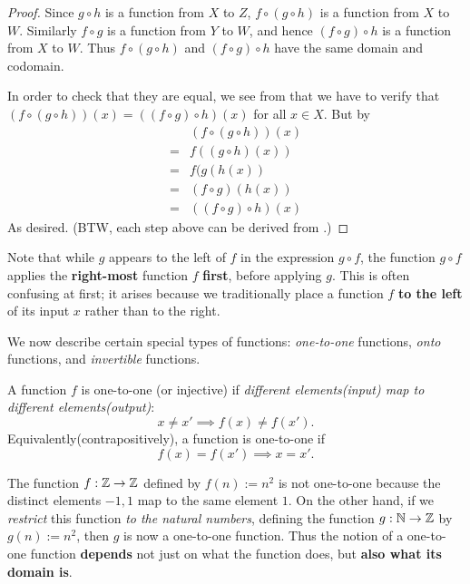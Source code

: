 \begin{proof}
Since \(g \circ h\) is a function from \(X\) to \(Z\), \(f \circ (g \circ h)\) is a function from \(X\) to \(W\).
Similarly \(f \circ g\) is a function from \(Y\) to \(W\), and hence \((f \circ g) \circ h\) is a function from \(X\) to \(W\).
Thus \(f \circ (g \circ h)\) and \((f \circ g) \circ h\) have the same domain and codomain.

In order to check that they are equal, we see from  that we have to verify that \((f \circ (g \circ h))(x) = ((f \circ g) \circ h)(x)\) for all \(x \in X\).
But by 
\begin{align*}
      & (f \circ (g \circ h))(x) \\
    = & f((g \circ h)(x)) \\
    = & f(g(h(x)) \\
    = & (f \circ g)(h(x)) \\
    = & ((f \circ g) \circ h)(x)
\end{align*}
As desired. (BTW, each step above can be derived from .)
\end{proof}

\begin{remark} \label{remark 3.3.13}
Note that while \(g\) appears to the left of \(f\) in the expression \(g \circ f\), the function \(g \circ f\) applies the \textbf{right-most} function \(f\)
\textbf{first}, before applying \(g\).
This is often confusing at first; it arises because we traditionally place a function \(f\) \textbf{to the left} of its input \(x\) rather than to the right.
\end{remark}

We now describe certain special types of functions: \emph{one-to-one} functions, \emph{onto} functions, and \emph{invertible} functions.

\begin{definition}  \label{def 3.3.14}
A function \(f\) is one-to-one (or injective) if \emph{different elements(input) map to different elements(output)}:
\[
x \neq x' \implies f(x) \neq f(x').
\]
Equivalently(contrapositively), a function is one-to-one if
\[
    f(x) = f(x') \implies x = x'.
\]
\end{definition}

\begin{example} [Informal] \label{example 3.3.15}
The function \(f : \mathbb{Z} \rightarrow \mathbb{Z}\) defined by \(f(n) := n^2\) is not one-to-one because the distinct elements \(-1, 1\) map to the same element \(1\). 
On the other hand, if we \emph{restrict} this function \emph{to the natural numbers}, defining the function \(g : \mathbb{N} \rightarrow \mathbb{Z}\) by \(g(n) := n^2\), then \(g\) is now a one-to-one function.
Thus the notion of a one-to-one function \textbf{depends} not just on what the function does, but \textbf{also what its domain is}.
\end{example}

